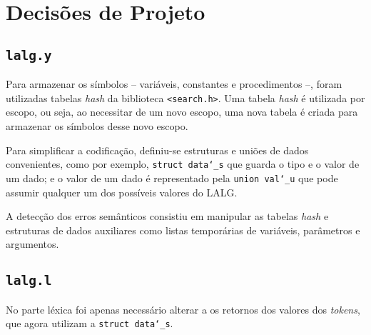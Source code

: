 \section{Decisões de Projeto \label{sec:decisoes-de-projeto}}

\subsection{\texttt{lalg.y}}

Para armazenar os símbolos -- variáveis, constantes e procedimentos --, foram utilizadas tabelas \textit{hash} da biblioteca \texttt{<search.h>}. Uma tabela \textit{hash} é utilizada por escopo, ou seja, ao necessitar de um novo escopo, uma nova tabela é criada para armazenar os símbolos desse novo escopo.

Para simplificar a codificação, definiu-se estruturas e uniões de dados convenientes, como por exemplo, \texttt{struct data\char`_s} que guarda o tipo e o valor de um dado; e o valor de um dado é representado pela \texttt{union val\char`_u} que pode assumir qualquer um dos possíveis valores do LALG.

A detecção dos erros semânticos consistiu em manipular as tabelas \textit{hash} e estruturas de dados auxiliares como listas temporárias de variáveis, parâmetros e argumentos.

\subsection{\texttt{lalg.l}}

No parte léxica foi apenas necessário alterar a os retornos dos valores dos \textit{tokens}, que agora utilizam a \texttt{struct data\char`_s}.
